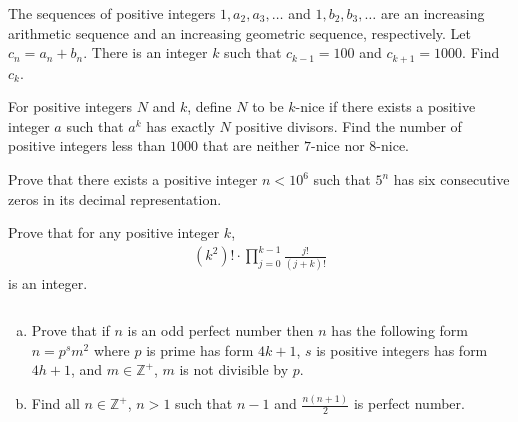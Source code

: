 \documentclass[problems.tex]{subfile}
\begin{document}
	\begin{problem}
		The sequences of positive integers $1,a_2,a_3,\ldots$ and $1,b_2,b_3,\ldots$ are an increasing arithmetic sequence and an increasing geometric sequence, respectively. Let $c_n=a_n+b_n$. There is an integer $k$ such that $c_{k-1}=100$ and $c_{k+1}=1000$. Find $c_k$. %
	\end{problem}

	\begin{problem}
		For positive integers $N$ and $k$, define $N$ to be $k$-nice if there exists a positive integer $a$ such that $a^k$ has exactly $N$ positive divisors. Find the number of positive integers less than $1000$ that are neither $7$-nice nor $8$-nice. %
	\end{problem}

	\begin{problem}[USAJMO 2016]
		Prove that there exists a positive integer $n < 10^6$ such that $5^n$ has six consecutive zeros in its decimal representation. %
	\end{problem}

	\begin{problem}[USAMO 2016]
		Prove that for any positive integer $k$,
			\begin{align*}
				(k^2)!\cdot\displaystyle\prod_{j=0}^{k-1}\frac{j!}{(j+k)!}
			\end{align*}
		is an integer. %
	\end{problem}

	\begin{problem}[USAMO 2016]
		$ $
		\begin{enumerate}[(a)]
			\item Prove that if $n$ is an odd perfect number then $n$ has the following form $n=p^sm^2$ where $p$ is prime has form $4k+1$, $s$ is positive integers has form $4h+1$, and $m\in\mathbb{Z}^+$, $m$ is not divisible by $p$.
			\item Find all $n\in\mathbb{Z}^+$, $n>1$ such that $n-1$ and $\frac{n(n+1)}{2}$ is perfect number.
		\end{enumerate}
	\end{problem}
\end{document}

